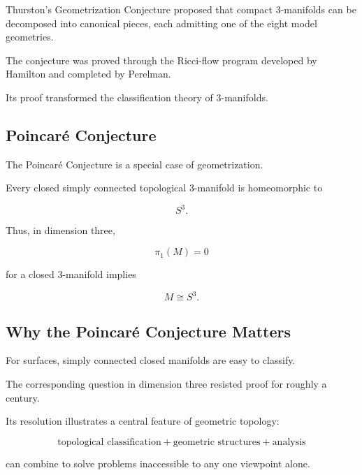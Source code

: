 Thurston's Geometrization Conjecture proposed that compact
\(3\)-manifolds can be decomposed into canonical pieces, each admitting one
of the eight model geometries.

The conjecture was proved through the Ricci-flow program developed by
Hamilton and completed by Perelman.

Its proof transformed the classification theory of \(3\)-manifolds.

\subsection{Poincar\'e Conjecture}
\label{subsec:poincare-conjecture}

The Poincar\'e Conjecture is a special case of geometrization.

\begin{theorem}
Every closed simply connected topological \(3\)-manifold is homeomorphic to

\[
\boxed{
S^3.
}
\]
\end{theorem}

Thus, in dimension three,

\[
\boxed{
\pi_1(M)=0
}
\]

for a closed \(3\)-manifold implies

\[
\boxed{
M\cong S^3.
}
\]

\subsection{Why the Poincar\'e Conjecture Matters}
\label{subsec:why-poincare-matters}

For surfaces, simply connected closed manifolds are easy to classify.

The corresponding question in dimension three resisted proof for roughly a
century.

Its resolution illustrates a central feature of geometric topology:

\[
\boxed{
\text{topological classification}
+
\text{geometric structures}
+
\text{analysis}
}
\]

can combine to solve problems inaccessible to any one viewpoint alone.

